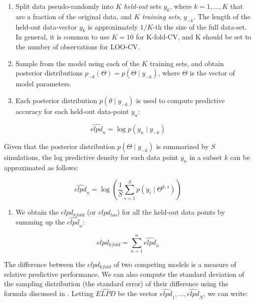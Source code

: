 \documentclass[12pt,]{krantz}
\providecommand{\tightlist}{%
  \setlength{\itemsep}{0pt}\setlength{\parskip}{0pt}}
\theoremstyle{definition}
\theoremstyle{definition}
\theoremstyle{definition}
\theoremstyle{remark}
\begin{document}
\begin{enumerate}
\def\labelenumi{\arabic{enumi}.}
\item
  Split data pseudo-randomly into \(K\) \textit{held-out} sets \(y_k\),
  where \(k=1,\dots,K\) that are a fraction of the original data, and
  \(K\) \textit{training sets}, \(y_{-k}\). The length of the held-out
  data-vector \(y_k\) is approximately \(1/K\)-th the size of the full
  data-set. In general, it is common to use \(K=10\) for K-fold-CV, and
  K should be set to the number of observations for LOO-CV. 
\item
  Sample from the model using each of the \(K\) training sets, and
  obtain posterior distributions
  \(p_{-k} (\Theta) = p(\Theta\mid y_{-k})\), where \(\Theta\) is the
  vector of model parameters.
\item
  Each posterior distribution \(p(\theta\mid y_{-k})\) is used to
  compute predictive accuracy for each held-out data-point \(y_n\):
\end{enumerate}

\begin{equation}
 \widehat{elpd}_n = \log p(y_n \mid y_{-k}) %
  \end{equation}

Given that the posterior distribution \(p(\Theta\mid y_{-k})\) is
summarized by \(S\) simulations, the log predictive density for each
data point \(y_n\) in a subset \(k\) can be approximated as follows:

\begin{equation}
    \widehat{elpd}_n = \log \left(\frac{1}{S} \sum_{s=1}^S p(y_i\mid \Theta^{k,s})\right)
    \label{eq:pwkfold}
  \end{equation}

\begin{enumerate}
\def\labelenumi{\arabic{enumi}.}
\setcounter{enumi}{4}
\tightlist
\item
  We obtain the \(elpd_{kfold}\) (or \(elpd_{loo}\)) for all the
  held-out data points by summing up the \(\widehat{elpd}_n\):
\end{enumerate}

\begin{equation} 
    elpd_{kfold} = \sum_{n=1}^n \widehat{elpd}_n
    \label{eq:totalkfold}
  \end{equation}

The difference between the \(elpd_{kfold}\) of two competing models is a
measure of relative predictive performance. We can also compute the
standard deviation of the sampling distribution (the standard error) of
their difference using the formula discussed in
\citet{vehtariPracticalBayesianModel2017}. Letting \(\widehat{ELPD}\) be
the vector \(\widehat{elpd}_1,\dots,\widehat{elpd}_N\), we can write:
\end{document}
